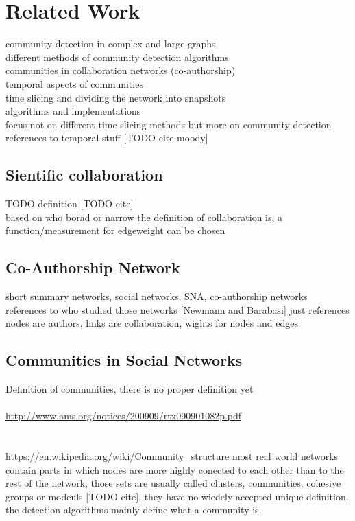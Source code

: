 \documentclass[runningheads,a4paper]{llncs}
\begin{document}
\section{Related Work}
\label{related}
community detection in complex and large graphs\\
different methods of community detection algorithms\\
communities in collaboration networks (co-authorship)\\
temporal aspects of communities\\
time slicing and dividing the network into snapshots\\
algorithms and implementations\\
focus not on different time slicing methods but more on community detection\\
references to temporal stuff [TODO cite moody]

\subsection{Sientific collaboration}
\label{related-collabo}
TODO definition [TODO cite]\\
based on who borad or narrow the definition of collaboration is, a function/measurement for edgeweight can be chosen

\subsection{Co-Authorship Network}
\label{related-coauth}
short summary networks, social networks, SNA, co-authorship networks\\
references to who studied those networks [Newmann and Barabasi] just references\\
nodes are authors, links are collaboration, wights for nodes and edges\\

\subsection{Communities in Social Networks}
\label{related-communities}
Definition of communities, there is no proper definition yet\\
\cite{girvan2002community}\\
\url{http://www.ams.org/notices/200909/rtx090901082p.pdf}\\
\cite{palla2005uncovering}\\
\cite{fortunato2010community}\\
\url{https://en.wikipedia.org/wiki/Community_structure}
most real world networks contain parts in which nodes are more highly conected to each other than to the rest of the network, those sets are usually called clusters, communities, cohesive groups or modeuls [TODO cite], they have no wiedely accepted unique definition. the detection algorithms mainly define what a community is.
\end{document}
